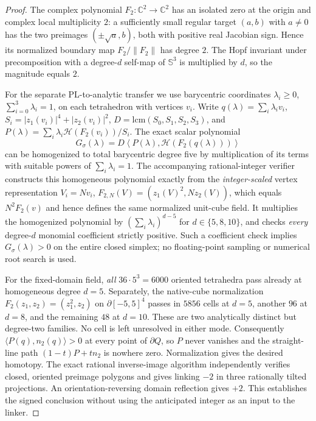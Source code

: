 \documentclass[aps,prd,onecolumn,notitlepage,11pt,superscriptaddress,longbibliography]{revtex4-2}
\newcommand{\Sph}{\mathbb S}
\newcommand{\norm}[1]{\left\lVert#1\right\rVert}
\begin{document}
\begin{proof}
The complex polynomial $F_2:\mathbb C^2\to\mathbb C^2$ has an isolated zero at the origin and complex local multiplicity $2$: a sufficiently small regular target $(a,b)$ with $a\ne0$ has the two preimages $(\pm\sqrt a,b)$, both with positive real Jacobian sign. Hence its normalized boundary map $F_2/\norm{F_2}$ has degree $2$. The Hopf invariant under precomposition with a degree-$d$ self-map of $\Sph^3$ is multiplied by $d$, so the magnitude equals $2$.

For the separate PL-to-analytic transfer we use barycentric coordinates $\lambda_i\ge0$, $\sum_{i=0}^{3}\lambda_i=1$, on each tetrahedron with vertices $v_i$. Write $q(\lambda)=\sum_i\lambda_i v_i$, $S_i=|z_1(v_i)|^4+|z_2(v_i)|^2$, $D=\mathrm{lcm}(S_0,S_1,S_2,S_3)$, and $P(\lambda)=\sum_i\lambda_i\mathcal H(F_2(v_i))/S_i$. The exact scalar polynomial
\begin{equation}\label{eq:v9alignment}
 G_\sigma(\lambda)=D\left\langle P(\lambda),\mathcal H(F_2(q(\lambda)))\right\rangle
\end{equation}
can be homogenized to total barycentric degree five by multiplication of its terms with suitable powers of $\sum_i\lambda_i=1$. The accompanying rational-integer verifier constructs this homogeneous polynomial exactly from the \emph{integer-scaled} vertex representation $V_i=Nv_i$, $F_{2,N}(V)=(z_1(V)^2,Nz_2(V))$, which equals $N^2F_2(v)$ and hence defines the same normalized unit-cube field. It multiplies the homogenized polynomial by $(\sum_i\lambda_i)^{d-5}$ for $d\in\{5,8,10\}$, and checks \emph{every} degree-$d$ monomial coefficient strictly positive. Such a coefficient check implies $G_\sigma(\lambda)>0$ on the entire closed simplex; no floating-point sampling or numerical root search is used.

For the fixed-domain field, \emph{all} $36\cdot5^3=6000$ oriented tetrahedra pass already at homogeneous degree $d=5$. Separately, the native-cube normalization $F_2(z_1,z_2)=(z_1^2,z_2)$ on $\partial[-5,5]^4$ passes in $5856$ cells at $d=5$, another $96$ at $d=8$, and the remaining $48$ at $d=10$. These are two analytically distinct but degree-two families. No cell is left unresolved in either mode. Consequently $\langle P(q),n_2(q)\rangle>0$ at every point of $\partial Q$, so $P$ never vanishes and the straight-line path $(1-t)P+t n_2$ is nowhere zero. Normalization gives the desired homotopy. The exact rational inverse-image algorithm independently verifies closed, oriented preimage polygons and gives linking $-2$ in three rationally tilted projections. An orientation-reversing domain reflection gives $+2$. This establishes the signed conclusion without using the anticipated integer as an input to the linker.
\end{proof}
\end{document}
